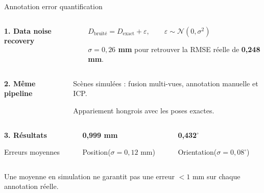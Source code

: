 \documentclass[aspectratio=169,11pt]{beamer}
\newcommand{\framesource}{}
\newcommand{\src}[1]{\gdef\framesource{#1}}
\newcommand{\key}[1]{{\color{teal}\bfseries #1}}
\newcommand{\smalltxt}{\fontsize{19}{24}\selectfont}
\newcommand{\captiontxt}{\fontsize{17}{21}\selectfont}
\newcommand{\lightline}{\par\vspace{7mm}{\color{rulegray}\hrule height .5pt}\par\vspace{9mm}}
\newcommand{\bignum}[1]{{\fontsize{34}{39}\selectfont\color{teal}\bfseries #1}}
\begin{document}
\begin{frame}{Annotation error quantification}
\src{Huang et al., §3.3 et tableau 3. Résultats mesurés en simulation.}
\begin{columns}[T,onlytextwidth]
\begin{column}{.29\textwidth}
\key{1. Data noise recovery}
\end{column}
\begin{column}{.67\textwidth}
\(\displaystyle D_{\mathrm{bruité}}=D_{\mathrm{exact}}+\varepsilon,\qquad
\varepsilon\sim\mathcal N(0,\sigma^2)\)
\par\smalltxt
\textbf{$\sigma=0{,}26$ mm} pour retrouver la RMSE réelle de \textbf{0,248 mm}.
\end{column}
\end{columns}
\lightline
\begin{columns}[T,onlytextwidth]
\begin{column}{.29\textwidth}
\key{2. Même pipeline}
\end{column}
\begin{column}{.67\textwidth}
Scènes simulées : fusion multi-vues, annotation manuelle et ICP.
\par\smalltxt
Appariement hongrois avec les poses exactes.
\end{column}
\end{columns}
\lightline
\begin{columns}[T,onlytextwidth]
\begin{column}{.29\textwidth}
\key{3. Résultats}
\par\smalltxt Erreurs moyennes
\end{column}
\begin{column}{.30\textwidth}
\bignum{0,999 mm}
\par\smalltxt Position\qquad ($\sigma=0{,}12$ mm)
\end{column}
\begin{column}{.32\textwidth}
\bignum{0,432$^\circ$}
\par\smalltxt Orientation\qquad ($\sigma=0{,}08^\circ$)
\end{column}
\end{columns}
\par\vspace{5mm}
{\captiontxt\color{muted}Une moyenne en simulation ne garantit pas une erreur $<1$ mm sur chaque annotation réelle.}
\end{frame}
\end{document}
